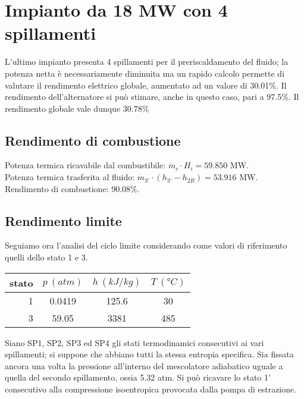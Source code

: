\section{Impianto da 18 MW con 4 spillamenti}
L'ultimo impianto presenta 4 spillamenti per il preriscaldamento del fluido; la potenza netta è necessariamente diminuita
ma un rapido calcolo permette di valutare il rendimento elettrico globale, aumentato ad un valore di 30.01\%.
Il rendimento dell'alternatore si può stimare, anche in questo caso, pari a 97.5\%.
Il rendimento globale vale dunque 30.78\%

\subsection{Rendimento di combustione}
Potenza termica ricavabile dal combustibile: $\dot m_c \cdot H_i = 59.850$ MW.\\
Potenza termica trasferita al fluido: $\dot m_{3'} \cdot (h_{3'} - h_{2R}) = 53.916$ MW.\\
Rendimento di combustione: 90.08\%.

\subsection{Rendimento limite}
Seguiamo ora l'analisi del ciclo limite considerando come valori di riferimento quelli dello stato 1 e 3.
\begin{center}
    \begin{tabular}{r|c|c|c}
        stato    & $p\ (atm)$ & $h\ (kJ/kg)$ & $T\ (\text{°}C) $\\ \hline
        1   &        0.0419 &          125.6   &           30     \\ \hline
        3   &        59.05  &           3381   &           485
    \end{tabular}
\end{center}
Siano SP1, SP2, SP3 ed SP4 gli stati termodinamici consecutivi ai vari spillamenti; si suppone che abbiano tutti la stessa entropia specifica.
Sia fissata ancora una volta la pressione all'interno del mescolatore adiabatico uguale a quella del secondo spillamento, ossia 5.32 atm.
Si può ricavare lo stato 1' consecutivo alla compressione isoentropica provocata dalla pompa di estrazione.

